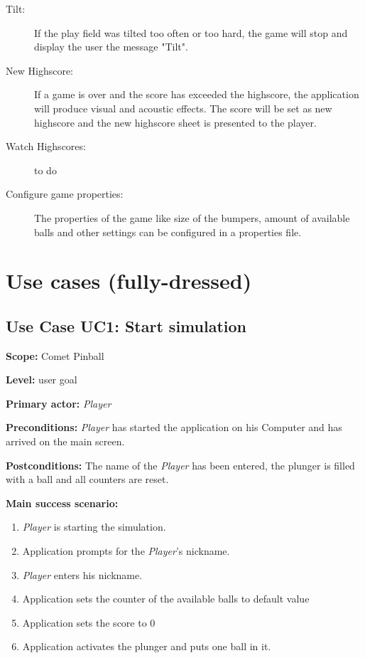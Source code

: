 \documentclass[fontsize=12pt,
               paper=a4,
               twoside=false,
               parskip=half,
               ]{scrartcl}
\begin{document}
\begin{description}
\item[Tilt:] If the play field was tilted too often or too hard, the game will stop and display the user the message "Tilt".

\item[New Highscore:] If a game is over and the score has exceeded the highscore, the application will produce visual and acoustic effects. The score will be set as new highscore and the new highscore sheet is presented to the player.

\item[Watch Highscores:] 
to do

\item[Configure game properties:] The properties of the game like size of the bumpers, amount of available balls and other settings can be configured in a properties file.

\end{description}





\section{Use cases (fully-dressed)}

\subsection{Use Case UC1: Start simulation}

\textbf{\textsf{Scope:}} Comet Pinball

\textbf{\textsf{Level:}} user goal

\textbf{\textsf{Primary actor:}} \emph{Player}

\textbf{\textsf{Preconditions:}} \emph{Player} has started the application on his Computer and has arrived on the main screen.

\textbf{\textsf{Postconditions:}} The name of the \emph{Player} has been entered, the plunger is filled with a ball and all counters are reset.

\textbf{\textsf{Main success scenario:}}

\begin{enumerate}[leftmargin=3em]
	\item \emph{Player} is starting the simulation.
	\item Application prompts for the \emph{Player}'s nickname.
	\item \emph{Player} enters his nickname.
	\item Application sets the counter of the available balls to default value
	\item Application sets the score to 0
	\item Application activates the plunger and puts one ball in it.
\end{enumerate}
\end{document}
